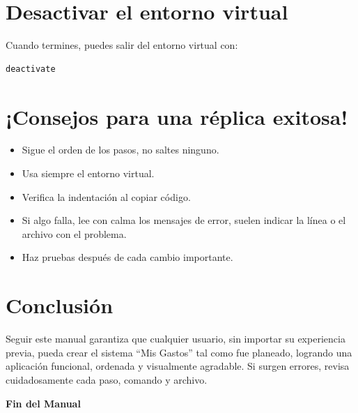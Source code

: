 \documentclass[12pt,a4paper]{article}
\begin{document}
\section{Desactivar el entorno virtual}
Cuando termines, puedes salir del entorno virtual con:
\begin{lstlisting}[language=bash]
deactivate
\end{lstlisting}

\section{¡Consejos para una réplica exitosa!}
\begin{itemize}
    \item Sigue el orden de los pasos, no saltes ninguno.
    \item Usa siempre el entorno virtual.
    \item Verifica la indentación al copiar código.
    \item Si algo falla, lee con calma los mensajes de error, suelen indicar la línea o el archivo con el problema.
    \item Haz pruebas después de cada cambio importante.
\end{itemize}

\section{Conclusión}
Seguir este manual garantiza que cualquier usuario, sin importar su experiencia previa, pueda crear el sistema “Mis Gastos” tal como fue planeado, logrando una aplicación funcional, ordenada y visualmente agradable. Si surgen errores, revisa cuidadosamente cada paso, comando y archivo.

\vfill
\begin{center}
    \textbf{ Fin del Manual }
\end{center}
\end{document}
